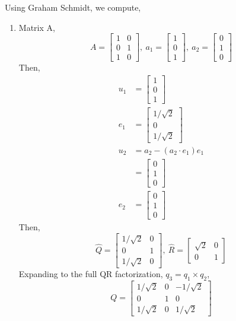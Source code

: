 \documentclass[letterpaper,10pt]{article}
\begin{document}
\begin{description}
Using Graham Schmidt, we compute,
\begin{enumerate}
\item Matrix A,
\[A=\begin{bmatrix}
1 & 0\\0 & 1\\1 & 0
\end{bmatrix},\ a_1=\begin{bmatrix}
1\\0\\1
\end{bmatrix},\ a_2=\begin{bmatrix}
0\\1\\0
\end{bmatrix} \]
Then,
\begin{align*}
u_1 &= \begin{bmatrix}
1\\0\\1
\end{bmatrix}\\
e_1 &= \begin{bmatrix}
1/\sqrt{2}\\0\\1/\sqrt{2}
\end{bmatrix}\\
u_2&=a_2-(a_2\cdot e_1)e_1\\
&=\begin{bmatrix}
0\\1\\0
\end{bmatrix}\\
e_2 &= \begin{bmatrix}
0\\1\\0
\end{bmatrix}
\end{align*}
Then,
\[\hat{Q}=\begin{bmatrix}
1/\sqrt{2} & 0\\
0 & 1\\
1/\sqrt{2} & 0
\end{bmatrix},\ \hat{R}=\begin{bmatrix}
\sqrt{2} & 0\\
0 & 1
\end{bmatrix} \]
Expanding to the full QR factorization,
$q_3=q_1\times q_2$,
\[Q=\begin{bmatrix}
1/\sqrt{2} & 0 & -1/\sqrt{2}\\
0 & 1 & 0\\
1/\sqrt{2} & 0 & 1/\sqrt{2}

\end{bmatrix}\]
\end{enumerate}
\end{description}
\end{document}
